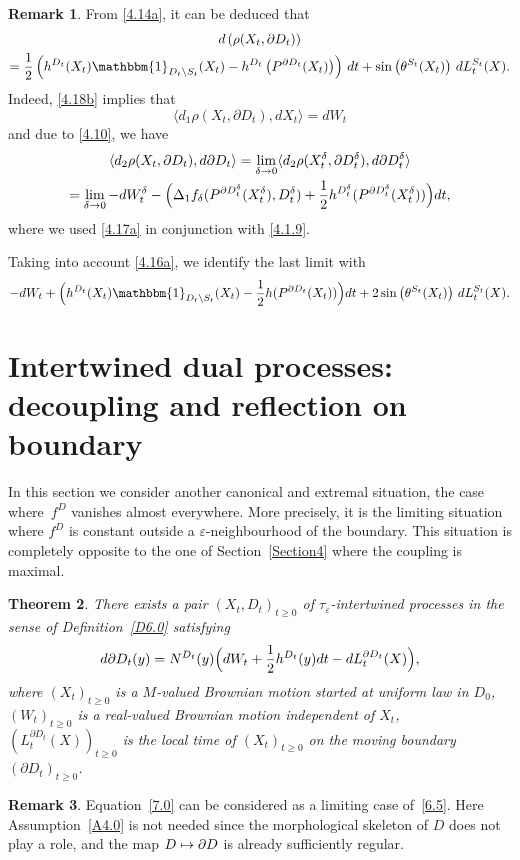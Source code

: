 \documentclass[JEP,XML,SOM,Unicode,NoFloatCountersInSection,published]{cedram}
\let\backslash\setminus
\newcommand\mto{\mathchoice{\longmapsto}{\mapsto}{\mapsto}{\mapsto}}
\theoremstyle{plain}
\newtheorem{thm}{Theorem}[section]
\theoremstyle{definition}
\newtheorem{remark}[thm]{Remark}
\newcommand{\bq}{\begin{equation*}}
\newcommand{\eq}{\end{equation*}}
\newcommand{\un}{\mathbbm{1}}
\let\f\frac
\let\d\delta
\let\e\varepsilon
\let\pa\partial
\begin{document}
\begin{remark}
From \eqref{4.14a}, it can be deduced that
\begin{multline}
d\left(\rho(X_t,\partial D_t)\right)\\
=
\f12\left(h^{D_t}(X_t)\un_{D_t \backslash S_t}(X_t)-h^{D_t}\left(P^{\partial D_t}(X_t)\right)\right)\, dt +\sin\left(\theta^{S_t}(X_t)\right)\,dL_t^{S_t}(X).
\end{multline}
Indeed, \eqref{4.18b} implies that
\bq \langle d_1\rho (X_t,\partial D_t), dX_t\rangle= dW_t\eq
and due to \eqref{4.10}, we have
\begin{multline*}
\langle d_2\rho (X_t,\partial D_t), d\partial D_t\rangle
=\lim_{\d\to0}\langle d_2\rho (X_t^\d,\partial D_t^\d), d\partial D_t^\d\rangle
\\
=\lim_{\d\to0}
-dW^\d_t-\Bigl(\Delta_1f_\d(P^{\pa D_t^\d}(X^\d_t),D_t^\d)+\f12h^{D_t^\d}(P^{\pa D_t^\d}(X^\d_t))\Bigr)dt,
\end{multline*}
where we used
\eqref{4.17a} in conjunction with \eqref{4.1.9}.
\par Taking into account \eqref{4.16a}, we identify the last limit with
\bq
-dW_t+\Bigl(h^{D_t}(X_t)\un_{D_t \backslash S_t}(X_t)-\f12h(P^{\pa D_t}(X_t))\Bigr)dt +2\sin\left(\theta^{S_t}(X_t)\right)\,dL_t^{S_t}(X).
\eq
\end{remark}

\section{Intertwined dual processes: decoupling and reflection on boundary}
\label{Section7}

In this section we consider another canonical and extremal situation, the case where~$f^D$ vanishes almost everywhere. More precisely, it is the limiting situation where $f^D$ is constant outside a $\e$-neighbourhood of the boundary. This situation is completely opposite to the one of Section~\ref{Section4} where the coupling is maximal.

\begin{thm}
\label{T7.1}
There exists a pair $(X_t,D_t)_{t\ge 0}$ of $\tau_\e$-intertwined processes in the sense of Definition~\ref{D6.0} satisfying
\begin{equation}
\label{7.0}
d\partial D_t(y)=N^{D_t}(y)\Bigl( dW_t +\f12 h^{D_t}(y)dt-dL^{\partial D_t}_t(X)\Bigr),
\end{equation}
where $(X_t)_{t\ge0}$ is a $M$-valued Brownian motion started at uniform law in $D_0$, $(W_t)_{t\ge0}$ is a real-valued Brownian motion independent of $X_t$, $(L^{\partial D_t}_t(X))_{t\ge0}$ is the local time of $(X_t)_{t\ge0}$ on the moving boundary $(\partial D_t)_{t\ge0}$.
\end{thm}
\begin{remark}
Equation~\eqref{7.0} can be considered as a limiting case of~\eqref{6.5}. Here Assumption~\ref{A4.0} is not needed since the morphological skeleton of $D$ does not play a role, and the map $D\mto \partial D$ is already sufficiently regular.
\end{remark}
\end{document}
